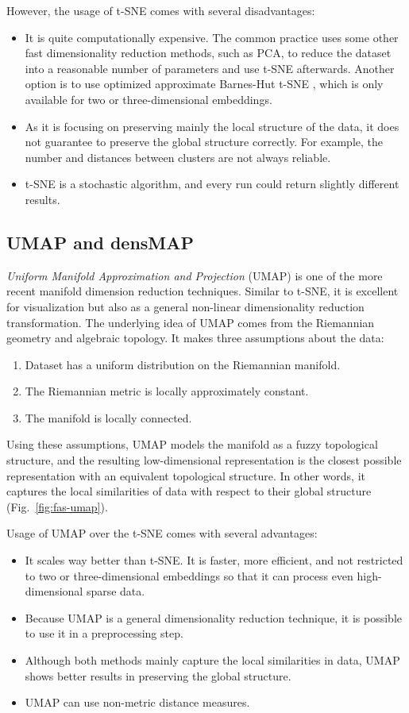 However, the usage of t-SNE comes with several disadvantages:
\begin{itemize}
    \item It is quite computationally expensive. The common practice uses some other fast dimensionality reduction methods, such as PCA, to reduce the dataset into a reasonable number of parameters and use t-SNE afterwards. Another option is to use optimized approximate Barnes-Hut t-SNE \cite{vis:barnes-hut-tsne}, which is only available for two or three-dimensional embeddings.
    \item As it is focusing on preserving mainly the local structure of the data, it does not guarantee to preserve the global structure correctly. For example, the number and distances between clusters are not always reliable.
    \item t-SNE is a stochastic algorithm, and every run could return slightly different results.
\end{itemize}


\subsection{UMAP and densMAP}
\textit{Uniform Manifold Approximation and Projection} (UMAP) \cite{vis:umap} is one of the more recent manifold dimension reduction techniques. Similar to t-SNE, it is excellent for visualization but also as a general non-linear dimensionality reduction transformation. The underlying idea of UMAP comes from the Riemannian geometry and algebraic topology. It makes three assumptions about the data:
\begin{enumerate}
    \item Dataset has a uniform distribution on the Riemannian manifold.
    \item The Riemannian metric is locally approximately constant.
    \item The manifold is locally connected.
\end{enumerate}
Using these assumptions, UMAP models the manifold as a fuzzy topological structure, and the resulting low-dimensional representation is the closest possible representation with an equivalent topological structure. In other words, it captures the local similarities of data with respect to their global structure (Fig.~\ref{fig:fas-umap}).

Usage of UMAP over the t-SNE comes with several advantages:
\begin{itemize}
    \item It scales way better than t-SNE. It is faster, more efficient, and not restricted to two or three-dimensional embeddings so that it can process even high-dimensional sparse data.
    \item Because UMAP is a general dimensionality reduction technique, it is possible to use it in a preprocessing step.
    \item Although both methods mainly capture the local similarities in data, UMAP shows better results in preserving the global structure.
    \item UMAP can use non-metric distance measures.
\end{itemize}

